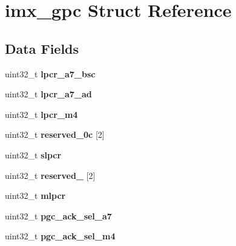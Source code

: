 \hypertarget{structimx__gpc}{}\section{imx\+\_\+gpc Struct Reference}
\label{structimx__gpc}
\subsection*{Data Fields}
\begin{DoxyCompactItemize}
\item 
\mbox{\label{structimx__gpc_a4bf067eaf321fec95a0692f64e4641cf}} 
uint32\+\_\+t {\bfseries lpcr\+\_\+a7\+\_\+bsc}
\item 
\mbox{\label{structimx__gpc_a2d9bdbadc81c83ab1ea07587ab3859f6}} 
uint32\+\_\+t {\bfseries lpcr\+\_\+a7\+\_\+ad}
\item 
\mbox{\label{structimx__gpc_ad0c5827f8ea7c999445e66b450f3bf1e}} 
uint32\+\_\+t {\bfseries lpcr\+\_\+m4}
\item 
\mbox{\label{structimx__gpc_aa94fb964db1695e2ab57b434bcade644}} 
uint32\+\_\+t {\bfseries reserved\+\_\+0c} \mbox{[}2\mbox{]}
\item 
\mbox{\label{structimx__gpc_a25cc28afeae6569c1d8c8da3178eb824}} 
uint32\+\_\+t {\bfseries slpcr}
\item 
\mbox{\label{structimx__gpc_aefd9975c1b40d7572e2e3d0cd3d9a0c5}} 
uint32\+\_\+t {\bfseries reserved\+\_} \mbox{[}2\mbox{]}
\item 
\mbox{\label{structimx__gpc_aededbd5b572e84d52ee8d46e31e44d33}} 
uint32\+\_\+t {\bfseries mlpcr}
\item 
\mbox{\label{structimx__gpc_af6ece4ddc2a0e56f74f7116c08827237}} 
uint32\+\_\+t {\bfseries pgc\+\_\+ack\+\_\+sel\+\_\+a7}
\item 
\mbox{\label{structimx__gpc_a786913d0d18b729c7ea38cfe7101beea}} 
uint32\+\_\+t {\bfseries pgc\+\_\+ack\+\_\+sel\+\_\+m4}
\item 
\mbox{\label{structimx__gpc_a93601c87541aa5122e4900f029d9678d}} 

\end{DoxyCompactItemize}
